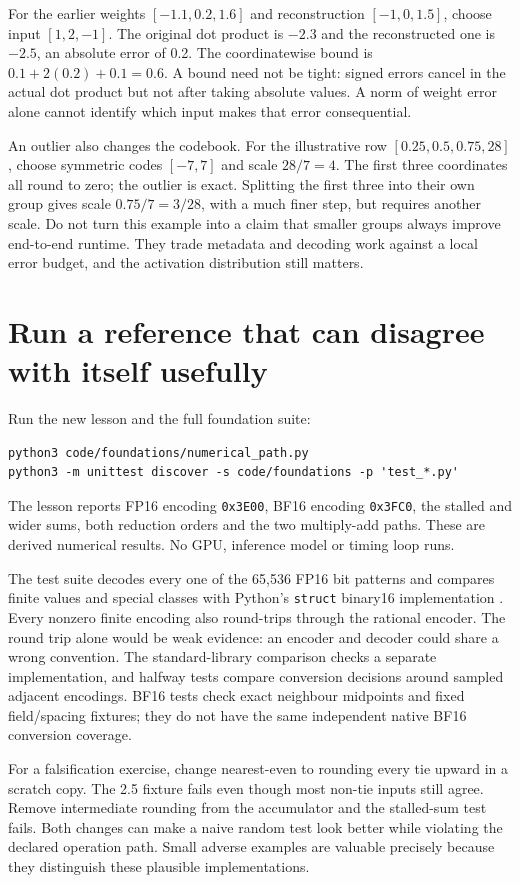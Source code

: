 For the earlier weights $[-1.1,0.2,1.6]$ and reconstruction
$[-1,0,1.5]$, choose input $[1,2,-1]$. The original dot product
is $-2.3$ and the reconstructed one is $-2.5$, an absolute
error of 0.2. The coordinatewise bound is
$0.1+2(0.2)+0.1=0.6$. A bound need not be tight: signed
errors cancel in the actual dot product but not after taking
absolute values. A norm of weight error alone cannot identify
which input makes that error consequential.

An outlier also changes the codebook. For the illustrative row
$[0.25,0.5,0.75,28]$, choose symmetric codes $[-7,7]$
and scale $28/7=4$. The first three coordinates all round to
zero; the outlier is exact. Splitting the first three into their
own group gives scale $0.75/7=3/28$, with a much finer step,
but requires another scale. Do not turn this example into a
claim that smaller groups always improve end-to-end runtime.
They trade metadata and decoding work against a local error
budget, and the activation distribution still matters.

\section{Run a reference that can disagree with itself usefully}
Run the new lesson and the full foundation suite:
\begin{verbatim}
python3 code/foundations/numerical_path.py
python3 -m unittest discover -s code/foundations -p 'test_*.py'
\end{verbatim}
The lesson reports FP16 encoding \texttt{0x3E00}, BF16 encoding
\texttt{0x3FC0}, the stalled and wider sums, both reduction
orders and the two multiply-add paths. These are derived
numerical results. No GPU, inference model or timing loop runs.

The test suite decodes every one of the 65,536 FP16 bit patterns
and compares finite values and special classes with Python's
\texttt{struct} binary16 implementation \cite{python2026struct}.
Every nonzero finite encoding also round-trips through the
rational encoder. The round trip alone would be weak evidence:
an encoder and decoder could share a wrong convention. The
standard-library comparison checks a separate implementation,
and halfway tests compare conversion decisions around sampled
adjacent encodings. BF16 tests check exact neighbour midpoints
and fixed field/spacing fixtures; they do not have the same
independent native BF16 conversion coverage.

For a falsification exercise, change nearest-even to rounding
every tie upward in a scratch copy. The 2.5 fixture fails even
though most non-tie inputs still agree. Remove intermediate
rounding from the accumulator and the stalled-sum test fails.
Both changes can make a naive random test look better while
violating the declared operation path. Small adverse examples
are valuable precisely because they distinguish these plausible
implementations.

